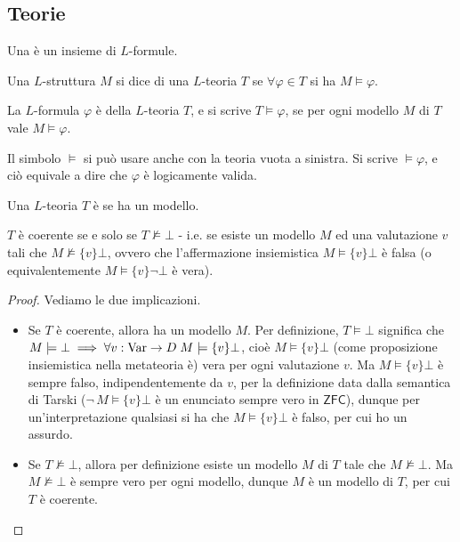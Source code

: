 \subsection{Teorie}

\begin{definition}[$L$-teoria]
    Una  è un insieme di $L$-formule.
\end{definition}

\begin{definition}[Modello]
    Una $L$-struttura $M$ si dice  di una $L$-teoria $T$ se $\forall \varphi \in T$ si ha $M \models \varphi$.
\end{definition}

\begin{definition}
    La $L$-formula $\varphi$ è  della $L$-teoria $T$, e si scrive $T \models \varphi$, se per ogni modello $M$ di $T$ vale $M \models \varphi$.
\end{definition}

\begin{note}
    Il simbolo $\models$ si può usare anche con la teoria vuota a sinistra. Si scrive $\models \varphi$, e ciò equivale a dire che $\varphi$ è logicamente valida.
\end{note}

\begin{definition}[Coerenza]
    Una $L$-teoria $T$ è  se ha un modello.
\end{definition}

\begin{remark}
    $T$ è coerente se e solo se $T \not \models \bot$ - i.e. se esiste un modello $M$ ed una valutazione $v$ tali che $M \not\models\{v\} \bot$, ovvero che l'affermazione insiemistica $M \models\{v\} \bot$ è falsa (o equivalentemente $M \models\{v\} \neg \bot$ è vera).
\end{remark}

\begin{proof}
    Vediamo le due implicazioni.
    \begin{itemize}
        \item [$\boxed{\implies}$] Se $T$ è coerente, allora ha un modello $M$. Per definizione, $T \models \bot$ significa che $M \models \bot \implies \forall v : \operatorname{Var} \to D \; M \models \{v\} \bot$,
        cioè $M \models \{v\}\bot$ (come proposizione insiemistica nella metateoria è) vera per ogni valutazione $v$. Ma $M \models\{v\} \bot$ è sempre falso, indipendentemente da $v$, per la definizione data dalla semantica di Tarski ($\neg\,M \models\{v\}\bot$ è un enunciato sempre vero in $\mathsf{ZFC}$), dunque per un'interpretazione qualsiasi si ha che $M \models\{v\} \bot$ è falso, per cui ho un assurdo.
        \item [$\boxed{\impliedby}$] Se $T \not\models \bot$, allora per definizione esiste un modello $M$ di $T$ tale che $M \not\models \bot$. Ma $M \not\models \bot$ è sempre vero per ogni modello, dunque $M$ è un modello di $T$, per cui $T$ è coerente.
    \end{itemize}
\end{proof}


